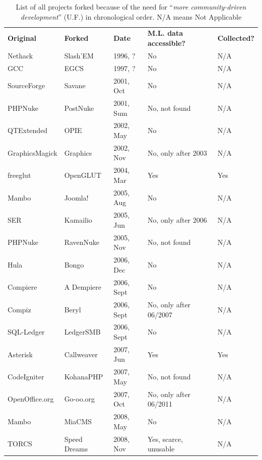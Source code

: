 \documentclass[11pt]{report}
\begin{document}
\begin{appendices}
\pagebreak

\begin{table} [H]
\centering
\caption[List of all projects forked because of the need for ``\textit{more community-driven development}'' (U.F.)]{List of all projects forked because of the need for ``\textit{more community-driven development}'' (U.F.) \cite{Robles} in chronological order. N/A means Not Applicable}
\label{tableProjectsForkedCat2CommunityDriven}
\begin{tabular}{m{} m{} m{} m{} m{}}
\hline\noalign{\smallskip}
\textbf{Original} & \textbf{Forked} & \textbf{Date} & \textbf{M.L. data accessible?} & \textbf{Collected?}\\
\noalign{\smallskip}\hline\noalign{\smallskip}
Nethack & Slash'EM & 1996, ? & No & N/A \\ \hline
GCC & EGCS & 1997, ? & No & N/A \\ \hline
SourceForge & Savane & 2001, Oct & No & N/A \\ \hline
PHPNuke & PostNuke & 2001, Sum & No, not found & N/A \\ \hline
QTExtended & OPIE & 2002, May & No & N/A \\ \hline
GraphicsMagick & Graphics & 2002, Nov  & No, only after 2003 & N/A \\ \hline
freeglut & OpenGLUT & 2004, Mar & Yes & Yes \\ \hline
Mambo & Joomla! & 2005, Aug & No & N/A \\ \hline
SER & Kamailio & 2005, Jun & No, only after 2006 & N/A \\ \hline
PHPNuke & RavenNuke & 2005, Nov & No, not found & N/A \\ \hline
Hula & Bongo & 2006, Dec & No & N/A \\ \hline
Compiere & A Dempiere & 2006, Sept & No & N/A \\ \hline
Compiz & Beryl & 2006, Sept & No, only after 06/2007 & N/A \\ \hline
SQL-Ledger & LedgerSMB & 2006, Sept & No & N/A \\ \hline
Asterisk & Callweaver & 2007, Jun & Yes & Yes \\ \hline
CodeIgniter & KohanaPHP & 2007, May & No, not found & N/A \\ \hline
OpenOffice.org & Go-oo.org & 2007, Oct & No, only after 06/2011 & N/A \\ \hline
Mambo & MiaCMS & 2008, May & No & N/A \\ \hline
TORCS & Speed Dreams & 2008, Nov & Yes, scarce, unusable & N/A \\ \hline

\end{tabular}
\end{table}
\end{appendices}
\end{document}
